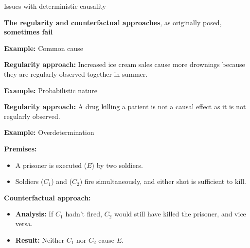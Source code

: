 \documentclass[aspectratio=169]{beamer}
\begin{document}
\begin{frame}{Issues with deterministic causality}
    
    \begin{center}
    \textbf{The regularity and counterfactual approaches}, as originally posed, \textbf{sometimes fail}    
    \end{center}
    
    \vspace{0.6cm}

\begin{minipage}{0.42\textwidth}
    \vspace{-0.05cm}
    
    \begin{center}
        \textbf{Example:} Common cause
    \end{center}
    \vspace{-0.2cm}
    
    \textbf{Regularity approach:} Increased ice cream sales cause more drownings because they are regularly observed together in summer.
    \vspace{0.15cm}
    
    \begin{center}
        \textbf{Example:} Probabilistic nature
    \end{center}
    \vspace{-0.2cm}
    
    \textbf{Regularity approach:} A drug killing a patient is not a causal effect as it is not regularly observed.
\end{minipage}\hspace{0.51cm}
\begin{minipage}{0.54\textwidth}
    \begin{center}
    \textbf{Example:} Overdetermination
\end{center}
\vspace{-0.1cm}

\textbf{Premises:}
{
\setlength{\leftmargini}{0.5cm} %
\begin{itemize}
    \item[$\bullet$] A prisoner is executed ($E$) by two soldiers.
    \item[$\bullet$] Soldiers ($C_1$) and ($C_2$) fire simultaneously, and either shot is sufficient to kill.
\end{itemize}

\vspace{0.05cm}

\textbf{Counterfactual approach:}
\begin{itemize}
    \item[$\bullet$] \textbf{Analysis:} If $C_1$ hadn’t fired, $C_2$ would still have killed the prisoner, and vice versa.
    \item[$\bullet$] \textbf{Result:} Neither $C_1$ nor $C_2$ cause $E$. %
\end{itemize}
}
   
\end{minipage}

    
    
\end{frame}
\end{document}
